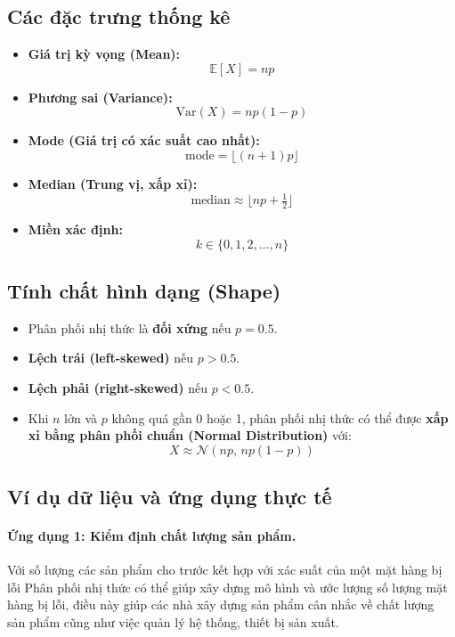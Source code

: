 \subsection{Các đặc trưng thống kê}

\begin{itemize}
    \item \textbf{Giá trị kỳ vọng (Mean):} 
    \[
    \mathbb{E}[X] = np
    \]
    \item \textbf{Phương sai (Variance):} 
    \[
    \mathrm{Var}(X) = np(1 - p)
    \]
    \item \textbf{Mode (Giá trị có xác suất cao nhất):}
    \[
    \mathrm{mode} = \lfloor (n + 1)p \rfloor
    \]
    \item \textbf{Median (Trung vị, xấp xỉ):}
    \[
    \mathrm{median} \approx \lfloor np + \tfrac{1}{2} \rfloor
    \]
    \item \textbf{Miền xác định:}
    \[
    k \in \{0, 1, 2, \dots, n\}
    \]
\end{itemize}

\subsection{Tính chất hình dạng (Shape)}

\begin{itemize}
    \item Phân phối nhị thức là \textbf{đối xứng} nếu $p = 0.5$.  
    \item \textbf{Lệch trái (left-skewed)} nếu $p > 0.5$.  
    \item \textbf{Lệch phải (right-skewed)} nếu $p < 0.5$.  
    \item Khi $n$ lớn và $p$ không quá gần 0 hoặc 1, phân phối nhị thức có thể được \textbf{xấp xỉ bằng phân phối chuẩn (Normal Distribution)} với:
    \[
    X \approx \mathcal{N}(np, \, np(1 - p))
    \]
\end{itemize}

\subsection{Ví dụ dữ liệu và ứng dụng thực tế}

\paragraph{Ứng dụng 1: Kiểm định chất lượng sản phẩm.} 
Với số lượng các sản phẩm cho trước kết hợp với xác suất của một mặt hàng bị lỗi
Phân phối nhị thức có thể giúp xây dựng mô hình và ước lượng số lượng
mặt hàng bị lỗi, điều này giúp các nhà xây dựng sản phẩm cân nhắc về chất lượng
sản phẩm cũng như việc quản lý hệ thống, thiết bị sản xuất.


